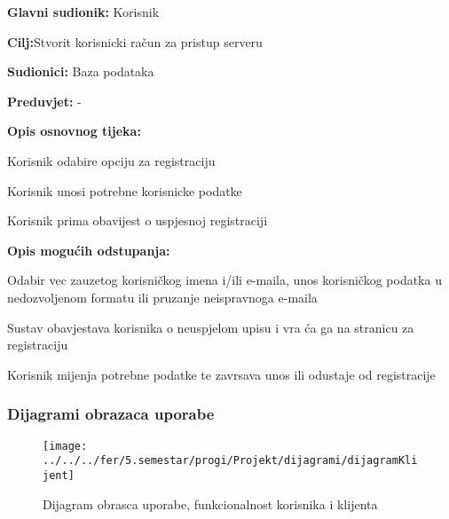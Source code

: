 \noindent {}
\begin{packed_item}
	
	\item \textbf{Glavni sudionik: } Korisnik
	\item  \textbf{Cilj:}Stvorit korisnicki račun za pristup serveru
	\item  \textbf{Sudionici:} Baza podataka
	\item  \textbf{Preduvjet:} -
	\item  \textbf{Opis osnovnog tijeka:}
	
	\item[] \begin{packed_enum}
		
		\item Korisnik odabire opciju za registraciju
		\item Korisnik unosi potrebne korisnicke podatke
		\item Korisnik prima obavijest o uspjesnoj registraciji
		
	\end{packed_enum}
	
		\item  \textbf{Opis mogućih odstupanja:}
	\item[] \begin{packed_item}
		
		\item[2.a] Odabir vec zauzetog korisničkog imena i/ili e-maila, unos korisničkog podatka u nedozvoljenom formatu ili pruzanje neispravnoga e-maila
		\item[] \begin{packed_enum}
			
			\item Sustav obavjestava korisnika o neuspjelom upisu i vra ća ga na stranicu za registraciju
			\item Korisnik mijenja potrebne podatke te zavrsava unos ili odustaje od registracije
		\end{packed_enum}
		
	\end{packed_item}
	
\end{packed_item}


\subsubsection{Dijagrami obrazaca uporabe}


\begin{figure}
	\centering
	\texttt{[image: ../../../fer/5.semestar/progi/Projekt/dijagrami/dijagramKlijent]}
	\caption{ Dijagram obrasca uporabe, funkcionalnost korisnika i klijenta}
	\label{fig:dijagramklijent}
	
\end{figure}

